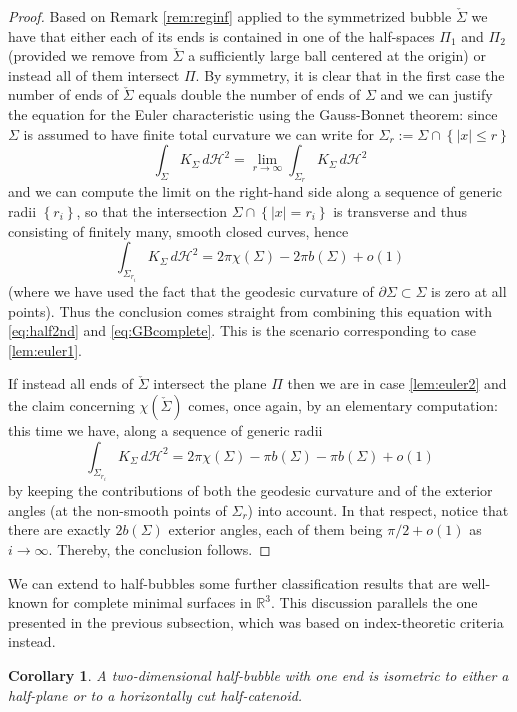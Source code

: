 \documentclass[JEP,XML,SOM,Unicode]{cedram}
\newcounter{cas}
\newtheorem{cor}[thm]{Corollary}
\theoremstyle{definition}
\newcommand{\R}{\mathbb{R}}
\newcommand{\h}{\mathscr{H}}
\begin{document}
\begin{proof}
Based on Remark \ref{rem:reginf} applied to the symmetrized bubble $\check{\Sigma}$ we have that either each of its ends is contained in one of the half-spaces $\Pi_1$ and $\Pi_2$ (provided we remove from $\check{\Sigma}$ a sufficiently large ball centered at the origin) or instead all of them intersect $\Pi$. By symmetry, it is clear that in the first case the number of ends of $\check{\Sigma}$ equals double the number of ends of $\Sigma$ and we can justify the equation for the Euler characteristic using the Gauss-Bonnet theorem: since $\Sigma$ is assumed to have finite total curvature we can write for $\Sigma_r:=\Sigma \cap \left\{|x|\leq r\right\}$
\[
\int_{\Sigma}K_{\Sigma}\,d\h^2=\lim_{r\to\infty}\int_{\Sigma_r} K_{\Sigma}\,d\h^2
\]
and we can compute the limit on the right-hand side along a sequence of generic radii $\left\{r_i\right\}$, so that the intersection $\Sigma\cap \left\{|x|=r_i\right\}$ is transverse and thus consisting of finitely many, smooth closed curves, hence
\[
\int_{\Sigma_{r_i}} K_{\Sigma}\,d\h^2=2\pi \chi(\Sigma)-2\pi b(\Sigma)+o(1)
\]
(where we have used the fact that the geodesic curvature of $\partial\Sigma\subset\Sigma$ is zero at all points).
Thus the conclusion comes straight from combining this equation with \eqref{eq:half2nd} and \eqref{eq:GBcomplete}. This is the scenario corresponding to case \eqref{lem:euler1}.

If instead all ends of $\check{\Sigma}$ intersect the plane $\Pi$ then we are in case \eqref{lem:euler2} and the claim concerning $\chi(\check{\Sigma})$ comes, once again, by an elementary computation: this time we have, along a sequence of generic radii
\[
\int_{\Sigma_{r_i}} K_{\Sigma}\,d\h^2=2\pi \chi(\Sigma)-\pi b(\Sigma)-\pi b(\Sigma)+o(1)
\]
by keeping the contributions of both the geodesic curvature and of the exterior angles (at the non-smooth points of $\Sigma_r$) into account. In that respect, notice that there are exactly $2b(\Sigma)$ exterior angles, each of them being $\pi/2+o(1)$ as $i\to\infty$. Thereby, the conclusion follows.
\end{proof}

We can extend to half-bubbles some further classification results that are well-known for complete minimal surfaces in $\R^3$. This discussion parallels the one presented in the previous subsection, which was based on index-theoretic criteria instead.

\begin{cor}\label{cor:oneend}
A two-dimensional half-bubble with one end is isometric to either a half-plane or to a horizontally cut half-catenoid.
\end{cor}
\end{document}
